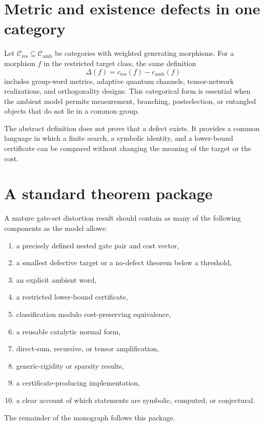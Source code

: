 \section{Metric and existence defects in one category}
Let $\mathcal C_{\mathrm{res}}\subseteq\mathcal C_{\mathrm{amb}}$ be categories with weighted generating morphisms.  For a morphism $f$ in the restricted target class, the same definition
\[
\Delta(f)=c_{\mathrm{res}}(f)-c_{\mathrm{amb}}(f)
\]
includes group-word metrics, adaptive quantum channels, tensor-network realizations, and orthogonality designs.  This categorical form is essential when the ambient model permits measurement, branching, postselection, or entangled objects that do not lie in a common group.

\begin{boundarybox}
The abstract definition does not prove that a defect exists.  It provides a common language in which a finite search, a symbolic identity, and a lower-bound certificate can be compared without changing the meaning of the target or the cost.
\end{boundarybox}

\section{A standard theorem package}
A mature gate-set distortion result should contain as many of the following components as the model allows:
\begin{enumerate}
\item a precisely defined nested gate pair and cost vector,
\item a smallest defective target or a no-defect theorem below a threshold,
\item an explicit ambient word,
\item a restricted lower-bound certificate,
\item classification modulo cost-preserving equivalence,
\item a reusable catalytic normal form,
\item direct-sum, recursive, or tensor amplification,
\item generic-rigidity or sparsity results,
\item a certificate-producing implementation,
\item a clear account of which statements are symbolic, computed, or conjectural.
\end{enumerate}
The remainder of the monograph follows this package.
